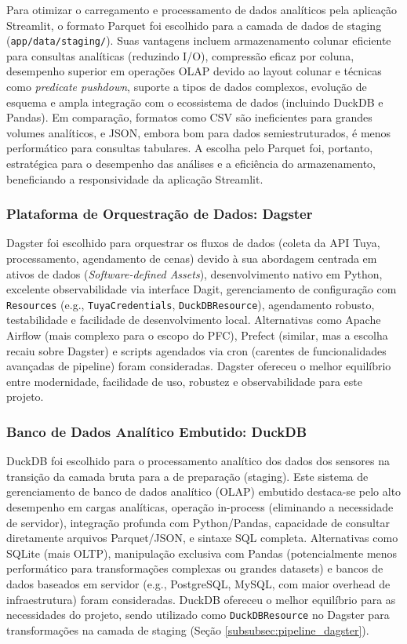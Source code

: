 Para otimizar o carregamento e processamento de dados analíticos pela aplicação Streamlit, o formato Parquet foi escolhido para a camada de dados de staging (\texttt{app/data/staging/}). Suas vantagens incluem armazenamento colunar eficiente para consultas analíticas (reduzindo I/O), compressão eficaz por coluna, desempenho superior em operações OLAP devido ao layout colunar e técnicas como \textit{predicate pushdown}, suporte a tipos de dados complexos, evolução de esquema e ampla integração com o ecossistema de dados (incluindo DuckDB e Pandas). Em comparação, formatos como CSV são ineficientes para grandes volumes analíticos, e JSON, embora bom para dados semiestruturados, é menos performático para consultas tabulares. A escolha pelo Parquet foi, portanto, estratégica para o desempenho das análises e a eficiência do armazenamento, beneficiando a responsividade da aplicação Streamlit.

\subsubsection{Plataforma de Orquestração de Dados: Dagster}
Dagster foi escolhido para orquestrar os fluxos de dados (coleta da API Tuya, processamento, agendamento de cenas) devido à sua abordagem centrada em ativos de dados (\textit{Software-defined Assets}), desenvolvimento nativo em Python, excelente observabilidade via interface Dagit, gerenciamento de configuração com \texttt{Resources} (e.g., \texttt{TuyaCredentials}, \texttt{DuckDBResource}), agendamento robusto, testabilidade e facilidade de desenvolvimento local. Alternativas como Apache Airflow (mais complexo para o escopo do PFC), Prefect (similar, mas a escolha recaiu sobre Dagster) e scripts agendados via cron (carentes de funcionalidades avançadas de pipeline) foram consideradas. Dagster ofereceu o melhor equilíbrio entre modernidade, facilidade de uso, robustez e observabilidade para este projeto.

\subsubsection{Banco de Dados Analítico Embutido: DuckDB}
\label{subsubsec:selecao_duckdb}
DuckDB foi escolhido para o processamento analítico dos dados dos sensores na transição da camada bruta para a de preparação (staging). Este sistema de gerenciamento de banco de dados analítico (OLAP) embutido destaca-se pelo alto desempenho em cargas analíticas, operação in-process (eliminando a necessidade de servidor), integração profunda com Python/Pandas, capacidade de consultar diretamente arquivos Parquet/JSON, e sintaxe SQL completa. Alternativas como SQLite (mais OLTP), manipulação exclusiva com Pandas (potencialmente menos performático para transformações complexas ou grandes datasets) e bancos de dados baseados em servidor (e.g., PostgreSQL, MySQL, com maior overhead de infraestrutura) foram consideradas. DuckDB ofereceu o melhor equilíbrio para as necessidades do projeto, sendo utilizado como \texttt{DuckDBResource} no Dagster para transformações na camada de staging (Seção \ref{subsubsec:pipeline_dagster}).

